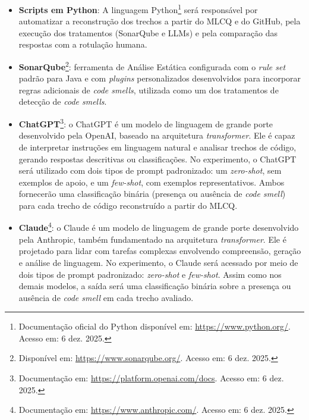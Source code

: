 \begin{itemize}
    \item \textbf{Scripts em Python}: A linguagem Python\footnote{Documentação oficial do Python disponível em: \href{https://www.python.org/}{https://www.python.org/}. Acesso em: 6 dez. 2025.}
    será responsável por automatizar a reconstrução dos trechos a partir do MLCQ e do GitHub, pela execução dos tratamentos 
    (SonarQube e LLMs) e pela comparação das respostas com a rotulação humana.
    
    \item \textbf{SonarQube}\footnote{Disponível em: \href{https://www.sonarqube.org/}{https://www.sonarqube.org/}. Acesso em: 6 dez. 2025.}: ferramenta de Análise Estática configurada com o \textit{rule set} padrão para Java e com \textit{plugins} personalizados desenvolvidos para incorporar regras adicionais de \textit{code smells}, utilizada como um dos tratamentos de 
    detecção de \textit{code smells}.
    
    \item \textbf{ChatGPT}\footnote{Documentação em: \href{https://platform.openai.com/docs}{https://platform.openai.com/docs}. Acesso em: 6 dez. 2025.}:
    o ChatGPT é um modelo de linguagem de grande porte desenvolvido pela OpenAI,
    baseado na arquitetura \textit{transformer}. Ele é capaz de interpretar instruções
    em linguagem natural e analisar trechos de código, gerando respostas descritivas
    ou classificações. No experimento, o ChatGPT será utilizado com dois tipos de
    prompt padronizado: um \textit{zero-shot}, sem exemplos de apoio, e um \textit{few-shot},
    com exemplos representativos. Ambos fornecerão uma classificação binária
    (presença ou ausência de \textit{code smell}) para cada trecho de código reconstruído
    a partir do MLCQ.
    
    \item \textbf{Claude}\footnote{Documentação em: \href{https://www.anthropic.com/}{https://www.anthropic.com/}. Acesso em: 6 dez. 2025.}:
    o Claude é um modelo de linguagem de grande porte desenvolvido pela Anthropic,
    também fundamentado na arquitetura \textit{transformer}. Ele é projetado para lidar
    com tarefas complexas envolvendo compreensão, geração e análise de linguagem.
    No experimento, o Claude será acessado por meio de dois tipos de prompt
    padronizado: \textit{zero-shot} e \textit{few-shot}. Assim como nos demais modelos,
    a saída será uma classificação binária sobre a presença ou ausência de
    \textit{code smell} em cada trecho avaliado.



\end{itemize}
